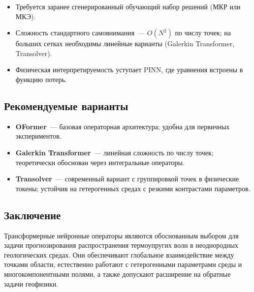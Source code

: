 \documentclass[12pt]{article}
\begin{document}
\begin{itemize}
\item Требуется заранее сгенерированный обучающий набор решений (МКР или МКЭ).
\item Сложность стандартного самовнимания~--- $O(N^2)$ по числу точек; на больших сетках необходимы линейные варианты (Galerkin Transformer, Transolver).
\item Физическая интерпретируемость уступает PINN, где уравнения встроены в функцию потерь.
\end{itemize}

\subsection*{Рекомендуемые варианты}

\begin{itemize}
\item \textbf{OFormer}~--- базовая операторная архитектура; удобна для первичных экспериментов.
\item \textbf{Galerkin Transformer}~--- линейная сложность по числу точек; теоретически обоснован через интегральные операторы.
\item \textbf{Transolver}~--- современный вариант с группировкой точек в физические токены; устойчив на гетерогенных средах с резкими контрастами параметров.
\end{itemize}

\subsection*{Заключение}

Трансформерные нейронные операторы являются обоснованным выбором для задачи прогнозирования распространения термоупругих волн в неоднородных геологических средах. Они обеспечивают глобальное взаимодействие между точками области, естественно работают с гетерогенными параметрами среды и многокомпонентными полями, а также допускают расширение на обратные задачи геофизики.
\end{document}

